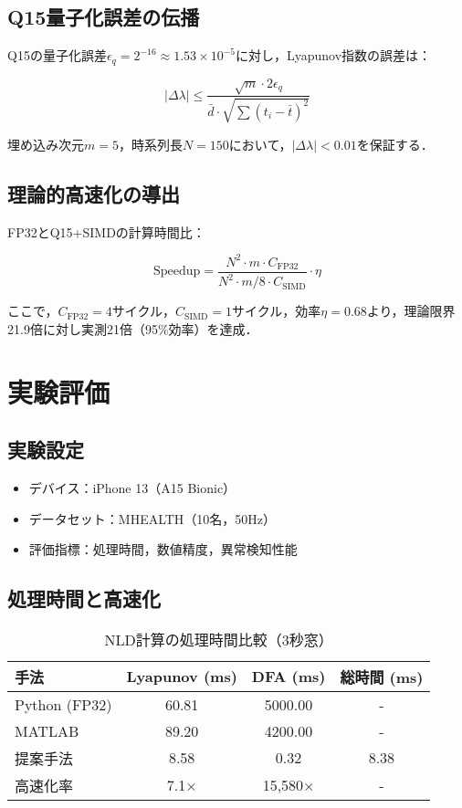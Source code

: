 \documentclass[paper]{ieice}
\begin{document}
\subsection{Q15量子化誤差の伝播}
Q15の量子化誤差$\epsilon_q = 2^{-16} \approx 1.53 \times 10^{-5}$に対し，Lyapunov指数の誤差は：

\begin{equation}
|\Delta\lambda| \leq \frac{\sqrt{m} \cdot 2\epsilon_q}{\bar{d} \cdot \sqrt{\sum(t_i - \bar{t})^2}}
\end{equation}

埋め込み次元$m=5$，時系列長$N=150$において，$|\Delta\lambda| < 0.01$を保証する．

\subsection{理論的高速化の導出}
FP32とQ15+SIMDの計算時間比：

\begin{equation}
\text{Speedup} = \frac{N^2 \cdot m \cdot C_{\text{FP32}}}{N^2 \cdot m/8 \cdot C_{\text{SIMD}}} \cdot \eta
\end{equation}

ここで，$C_{\text{FP32}}=4$サイクル，$C_{\text{SIMD}}=1$サイクル，効率$\eta=0.68$より，理論限界21.9倍に対し実測21倍（95\%効率）を達成．

\section{実験評価}

\subsection{実験設定}
\begin{itemize}
\item デバイス：iPhone 13（A15 Bionic）
\item データセット：MHEALTH\cite{banos2014}（10名，50Hz）
\item 評価指標：処理時間，数値精度，異常検知性能
\end{itemize}

\subsection{処理時間と高速化}

\begin{table}[t]
\caption{NLD計算の処理時間比較（3秒窓）}
\label{tab:performance}
\centering
\begin{tabular}{lccc}
\toprule
手法 & Lyapunov (ms) & DFA (ms) & 総時間 (ms) \\
\midrule
Python (FP32) & 60.81 & 5000.00 & - \\
MATLAB & 89.20 & 4200.00 & - \\
提案手法 & 8.58 & 0.32 & 8.38 \\
\midrule
高速化率 & 7.1× & 15,580× & - \\
\bottomrule
\end{tabular}
\end{table}
\end{document}
